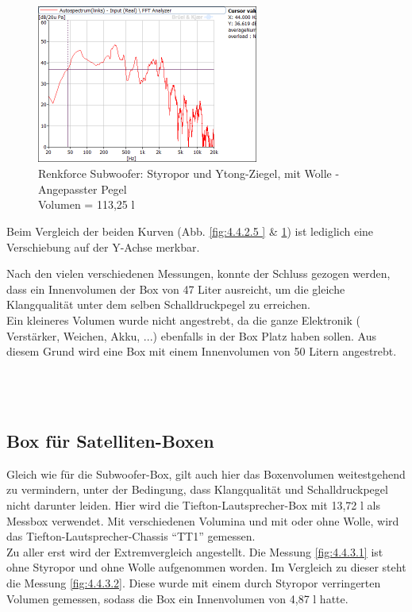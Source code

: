 \begin{figure} [H]
\centering
\includegraphics[width=0.65\textwidth]{img/Optimierung/Sub/RenkforceStyro_113l_Wolle_Angepasst.png}
\caption{Renkforce Subwoofer: Styropor und Ytong-Ziegel, mit Wolle - Angepasster Pegel \\Volumen = 113,25 l}
\label{fig:4.4.2.6}
\end{figure}
Beim Vergleich der beiden Kurven (Abb. \ref{fig:4.4.2.5 } \& \ref{fig:4.4.2.6}) ist lediglich eine Verschiebung auf der Y-Achse merkbar.

\newpage
Nach den vielen verschiedenen Messungen, konnte der Schluss gezogen werden, dass ein Innenvolumen der Box von 47 Liter ausreicht, um die gleiche Klangqualität unter dem selben Schalldruckpegel zu erreichen.\\
Ein kleineres Volumen wurde nicht angestrebt, da die ganze Elektronik ( Verstärker, Weichen, Akku, ...) ebenfalls in der Box Platz haben sollen.
Aus diesem Grund wird eine Box mit einem Innenvolumen von 50 Litern angestrebt.\\ \\ \\ \\




\subsection{Box für Satelliten-Boxen}\label{subsec:4.4.3}
Gleich wie für die Subwoofer-Box, gilt auch hier das Boxenvolumen weitestgehend zu vermindern, unter der Bedingung, dass Klangqualität und Schalldruckpegel nicht darunter leiden.
Hier wird die Tiefton-Lautsprecher-Box mit 13,72 l als Messbox verwendet.
Mit verschiedenen Volumina und mit oder ohne Wolle, wird das Tiefton-Lautsprecher-Chassis \enquote{TT1} gemessen.\\
Zu aller erst wird der Extremvergleich angestellt.
Die Messung \ref{fig:4.4.3.1} ist ohne Styropor und ohne Wolle aufgenommen worden.
Im Vergleich zu dieser steht die Messung \ref{fig:4.4.3.2}.
Diese wurde mit einem durch Styropor verringerten Volumen gemessen, sodass die Box ein Innenvolumen von 4,87 l hatte.

